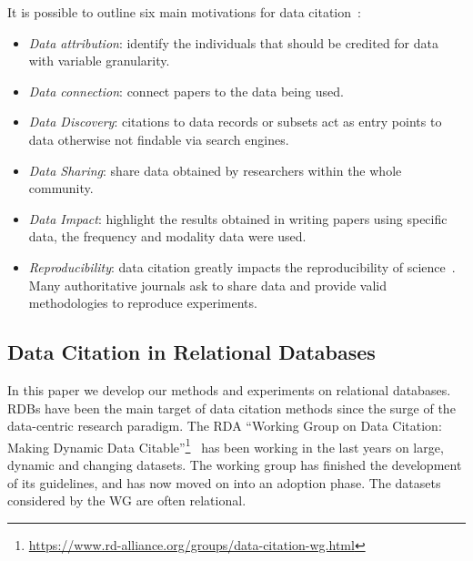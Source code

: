 It is possible to outline six main motivations for data citation~\citep{Silvello18jasist}:
\begin{itemize}
	\item \emph{Data attribution}: identify the individuals that should be credited for data with variable granularity.
	\item \emph{Data connection}: connect papers to the data being used.
    \item \emph{Data Discovery}: citations to data records or subsets act as entry points to data otherwise not findable via search engines. 
    \item \emph{Data Sharing}: share data obtained by researchers within the whole community. 
    \item \emph{Data Impact}: highlight the results obtained in writing papers using specific data, the frequency and modality data were used.
    \item \emph{Reproducibility}: data citation greatly impacts the reproducibility of science~\citep{baggerly2010disclose}. Many authoritative journals ask to share data and provide valid methodologies to reproduce experiments.
\end{itemize}

\subsection{Data Citation in Relational Databases}
In this paper we develop our methods and experiments on relational databases. RDBs have been the main target of data citation methods since the surge of the data-centric research paradigm. 
The RDA ``Working Group on Data Citation: Making Dynamic Data Citable''\footnote{\url{https://www.rd-alliance.org/groups/data-citation-wg.html}}~\citep{RauberEtAl2016} has been working in the last years on large, dynamic and changing datasets. The working group has finished the development of its guidelines, and has now moved on into an adoption phase. 
The datasets considered by the WG are often relational.

